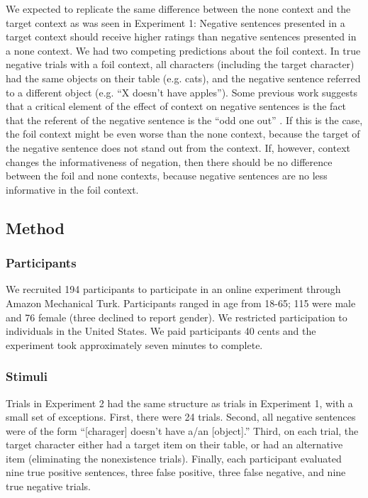 \documentclass[10pt,letterpaper]{article}
\begin{document}
We expected to replicate the same difference between the none context and the target context as was seen in Experiment 1: Negative sentences presented in a target context should receive higher ratings than negative sentences presented in a none context.  We had two competing predictions about the foil context.
In true negative trials with a foil context, all characters (including the target character) had the same objects on their table (e.g. cats), and the negative sentence referred to a different object (e.g. ``X doesn't have apples'').  Some previous work suggests that a critical element of the effect of context on negative sentences is the fact that the referent of the negative sentence is the ``odd one out'' \cite{wason1965}.  If this is the case, the foil context might be even worse than the none context, because the target of the negative sentence does not stand out from the context.  If, however, context changes the informativeness of negation, then there should be no difference between the foil and none contexts, because negative sentences are no less informative in the foil context.  

\subsection{Method}

\subsubsection{Participants}

We recruited 194 participants to participate in an online experiment through Amazon Mechanical Turk.  Participants ranged in age from 18-65; 115 were male and 76 female (three declined to report gender).  We restricted participation to individuals in the United States. We paid participants 40 cents and the experiment took approximately seven minutes to complete.  

\subsubsection{Stimuli}

Trials in Experiment 2 had the same structure as trials in Experiment 1, with a small set of exceptions. First, there were 24 trials. Second, all negative sentences were of the form ``[charager] doesn't have a/an [object].'' Third, on each trial, the target character either had a target item on their table, or had an alternative item (eliminating the nonexistence trials).  Finally, each participant evaluated nine true positive sentences, three false positive, three false negative, and nine true negative trials.
\end{document}

